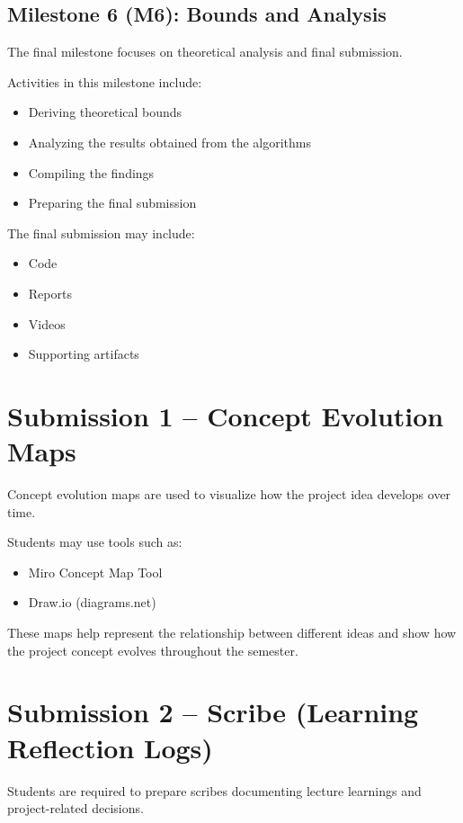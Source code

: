 \documentclass[12pt,a4paper]{article}
\begin{document}
\subsection{Milestone 6 (M6): Bounds and Analysis}

The final milestone focuses on theoretical analysis and final submission.

Activities in this milestone include:

\begin{itemize}
\item Deriving theoretical bounds
\item Analyzing the results obtained from the algorithms
\item Compiling the findings
\item Preparing the final submission
\end{itemize}

The final submission may include:

\begin{itemize}
\item Code
\item Reports
\item Videos
\item Supporting artifacts
\end{itemize}

\section{Submission 1 – Concept Evolution Maps}

Concept evolution maps are used to visualize how the project idea develops over time.

Students may use tools such as:

\begin{itemize}
\item Miro Concept Map Tool
\item Draw.io (diagrams.net)
\end{itemize}

These maps help represent the relationship between different ideas and show how the project concept evolves throughout the semester.

\section{Submission 2 – Scribe (Learning Reflection Logs)}

Students are required to prepare scribes documenting lecture learnings and project-related decisions.
\end{document}
